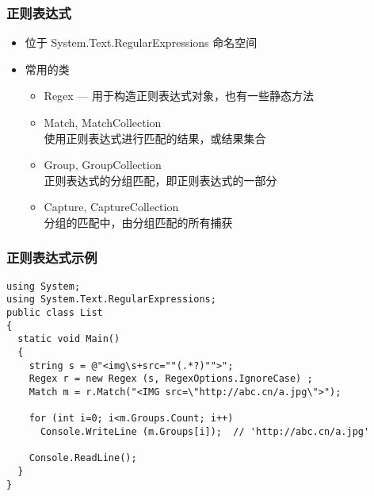 \begin{frame}
\frametitle{正则表达式}
\begin{itemize}
\setlength{\itemsep}{8pt plus 1pt}
\item 位于 System.Text.RegularExpressions 命名空间
\item 常用的类
\begin{itemize}
\setlength{\itemsep}{6pt plus 1pt}
\item Regex  --- 用于构造正则表达式对象，也有一些静态方法
\item Match, MatchCollection \\
  使用正则表达式进行匹配的结果，或结果集合
\item Group, GroupCollection \\
  正则表达式的分组匹配，即正则表达式的一部分
\item Capture, CaptureCollection \\
  分组的匹配中，由分组匹配的所有捕获
\end{itemize}
\end{itemize}
\end{frame}

\begin{frame}[fragile]
\frametitle{正则表达式示例}
\begin{lstlisting}[escapeinside='']
using System;
using System.Text.RegularExpressions;
public class List
{
  static void Main()
  {
    string s = @"<img\s+src=""(.*?)"">";
    Regex r = new Regex (s, RegexOptions.IgnoreCase) ;
    Match m = r.Match("<IMG src=\"http://abc.cn/a.jpg\">");

    for (int i=0; i<m.Groups.Count; i++)
      Console.WriteLine (m.Groups[i]);  // 'http://abc.cn/a.jpg'

    Console.ReadLine();
  }
}
\end{lstlisting}
\end{frame}

